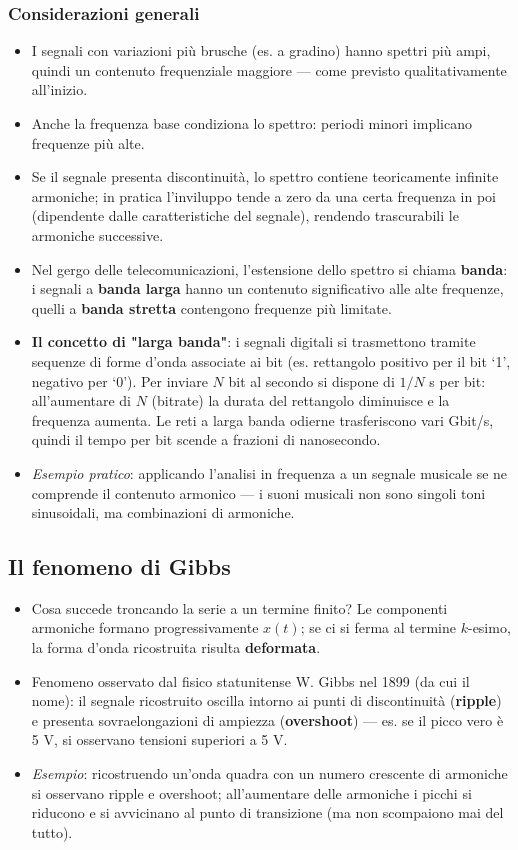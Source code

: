 \documentclass[12pt, a4paper]{article}
\begin{document}
\subsubsection{Considerazioni generali}
\begin{itemize}
    \item I segnali con variazioni più brusche (es. a gradino) hanno spettri più ampi, quindi un contenuto frequenziale maggiore — come previsto qualitativamente all'inizio.
    \item Anche la frequenza base condiziona lo spettro: periodi minori implicano frequenze più alte.
    \item Se il segnale presenta discontinuità, lo spettro contiene teoricamente infinite armoniche; in pratica l'inviluppo tende a zero da una certa frequenza in poi (dipendente dalle caratteristiche del segnale), rendendo trascurabili le armoniche successive.
    \item Nel gergo delle telecomunicazioni, l'estensione dello spettro si chiama \textbf{banda}: i segnali a \textbf{banda larga} hanno un contenuto significativo alle alte frequenze, quelli a \textbf{banda stretta} contengono frequenze più limitate.
    \item[] \textbf{Il concetto di "larga banda"}: i segnali digitali si trasmettono tramite sequenze di forme d'onda associate ai bit (es. rettangolo positivo per il bit `1', negativo per `0'). Per inviare $N$ bit al secondo si dispone di $1/N$ s per bit: all'aumentare di $N$ (bitrate) la durata del rettangolo diminuisce e la frequenza aumenta. Le reti a larga banda odierne trasferiscono vari Gbit/s, quindi il tempo per bit scende a frazioni di nanosecondo.
    \item[] \textit{Esempio pratico}: applicando l'analisi in frequenza a un segnale musicale se ne comprende il contenuto armonico — i suoni musicali non sono singoli toni sinusoidali, ma combinazioni di armoniche.
\end{itemize}

\subsection{Il fenomeno di Gibbs}
\begin{itemize}
    \item Cosa succede troncando la serie a un termine finito? Le componenti armoniche formano progressivamente $x(t)$; se ci si ferma al termine $k$-esimo, la forma d'onda ricostruita risulta \textbf{deformata}.
    \item Fenomeno osservato dal fisico statunitense W. Gibbs nel 1899 (da cui il nome): il segnale ricostruito oscilla intorno ai punti di discontinuità (\textbf{ripple}) e presenta sovraelongazioni di ampiezza (\textbf{overshoot}) — es. se il picco vero è 5 V, si osservano tensioni superiori a 5 V.
    \item \textit{Esempio}: ricostruendo un'onda quadra con un numero crescente di armoniche si osservano ripple e overshoot; all'aumentare delle armoniche i picchi si riducono e si avvicinano al punto di transizione (ma non scompaiono mai del tutto).
\end{itemize}
\end{document}
